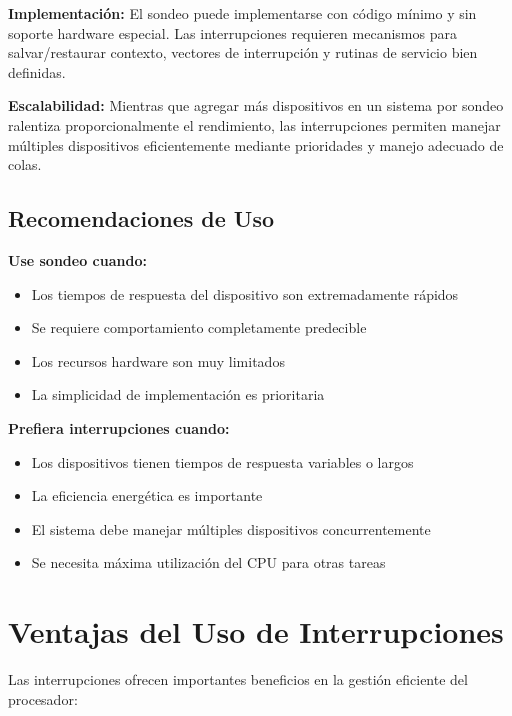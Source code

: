 \documentclass{article}
\begin{document}
\textbf{Implementación:}
El sondeo puede implementarse con código mínimo y sin soporte hardware especial. Las interrupciones requieren mecanismos para salvar/restaurar contexto, vectores de interrupción y rutinas de servicio bien definidas.

\textbf{Escalabilidad:}
Mientras que agregar más dispositivos en un sistema por sondeo ralentiza proporcionalmente el rendimiento, las interrupciones permiten manejar múltiples dispositivos eficientemente mediante prioridades y manejo adecuado de colas.

\subsection{Recomendaciones de Uso}

\textbf{Use sondeo cuando:}
\begin{itemize}[leftmargin=*]
    \item Los tiempos de respuesta del dispositivo son extremadamente rápidos
    \item Se requiere comportamiento completamente predecible
    \item Los recursos hardware son muy limitados
    \item La simplicidad de implementación es prioritaria
\end{itemize}

\textbf{Prefiera interrupciones cuando:}
\begin{itemize}[leftmargin=*]
    \item Los dispositivos tienen tiempos de respuesta variables o largos
    \item La eficiencia energética es importante
    \item El sistema debe manejar múltiples dispositivos concurrentemente
    \item Se necesita máxima utilización del CPU para otras tareas
\end{itemize}
\section{Ventajas del Uso de Interrupciones}

Las interrupciones ofrecen importantes beneficios en la gestión eficiente del procesador:
\end{document}
